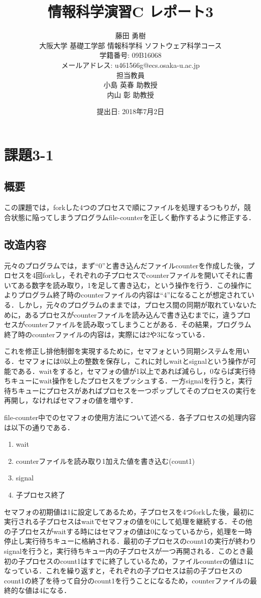 \documentclass[a4j,10pt,titlepage]{jsarticle}
\title{情報科学演習C レポート3}
\author{藤田 勇樹 \\
大阪大学 基礎工学部 情報科学科 ソフトウェア科学コース\\
学籍番号: 09B16068 \\
メールアドレス: u461566g@ecs.osaka-u.ac.jp \\
担当教員\\
小島 英春 助教授 \\
内山 彰 助教授}
\date{提出日: 2018年7月2日}
\begin{document}
\maketitle
\section{課題3-1}
\subsection{概要}
この課題では，forkした4つのプロセスで順にファイルを処理するつもりが，競合状態に陥ってしまうプログラムfile-counterを正しく動作するように修正する．

\subsection{改造内容}
元々のプログラムでは，まず``0''と書き込んだファイルcounterを作成した後，プロセスを4回forkし，それぞれの子プロセスでcounterファイルを開いてそれに書いてある数字を読み取り，1を足して書き込む，という操作を行う．この操作によりプログラム終了時のcounterファイルの内容は``4''になることが想定されている．しかし，元々のプログラムのままでは，プロセス間の同期が取れていないために，あるプロセスがcounterファイルを読み込んで書き込むまでに，違うプロセスがcounterファイルを読み取ってしまうことがある．その結果，プログラム終了時のcounterファイルの内容は，実際には2や3になっている．

これを修正し排他制御を実現するために，セマフォという同期システムを用いる．セマフォには0以上の整数を保存し，これに対しwaitとsignalという操作が可能である．waitをすると，セマフォの値が1以上であれば減らし，0ならば実行待ちキューにwait操作をしたプロセスをプッシュする．一方signalを行うと，実行待ちキューにプロセスがあればプロセスを一つポップしてそのプロセスの実行を再開し，なければセマフォの値を増やす．

file-counter中でのセマフォの使用方法について述べる．各子プロセスの処理内容は以下の通りである．
\begin{enumerate}
  \item wait
  \item counterファイルを読み取り1加えた値を書き込む(count1)
  \item signal
  \item 子プロセス終了
\end{enumerate}

セマフォの初期値は1に設定してあるため，子プロセスを4つforkした後，最初に実行される子プロセスはwaitでセマフォの値を0にして処理を継続する．その他の子プロセスがwaitする時にはセマフォの値は0になっているから，処理を一時停止し実行待ちキューに格納される．最初の子プロセスのcount1の実行が終わりsignalを行うと，実行待ちキュー内の子プロセスが一つ再開される．このとき最初の子プロセスのcount1はすでに終了しているため，ファイルcounterの値は1になっている．これを繰り返すと，それぞれの子プロセスは前の子プロセスのcount1の終了を待って自分のcount1を行うことになるため，counterファイルの最終的な値は4になる．
\end{document}
